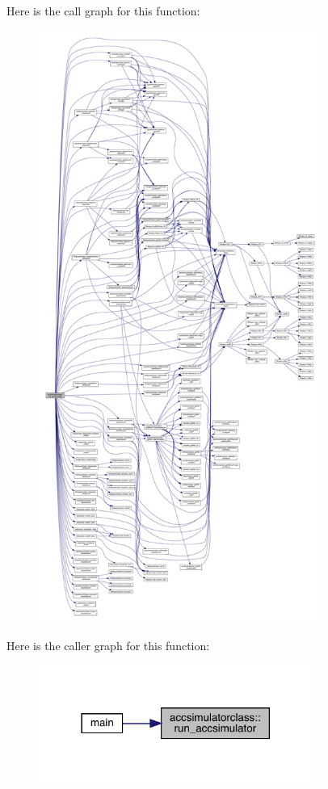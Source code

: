 Here is the call graph for this function\+:
\nopagebreak
\begin{figure}[H]
\begin{center}
\leavevmode
\includegraphics[height=550pt]{namespaceaccsimulatorclass_acbe26eeaf1cb4076384b90e1016785f0_cgraph}
\end{center}
\end{figure}
Here is the caller graph for this function\+:\nopagebreak
\begin{figure}[H]
\begin{center}
\leavevmode
\includegraphics[width=254pt]{namespaceaccsimulatorclass_acbe26eeaf1cb4076384b90e1016785f0_icgraph}
\end{center}
\end{figure}


